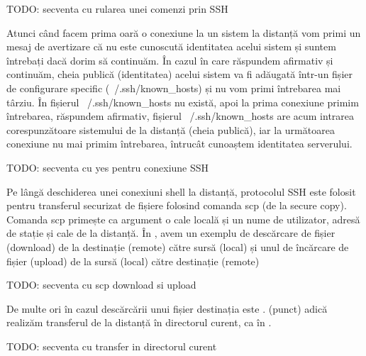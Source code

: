 \begin{screen}[caption={Rulare comenzi la distanță prin SSH},label={lst:sec:ssh-commands}]
TODO: secventa cu rularea unei comenzi prin SSH
\end{screen}

Atunci când facem prima oară o conexiune la un sistem la distanță vom primi un mesaj de avertizare că nu este cunoscută identitatea acelui sistem și suntem întrebați dacă dorim să continuăm. În cazul în care răspundem afirmativ și continuăm, cheia publică (identitatea) acelui sistem va fi adăugată într-un fișier de configurare specific (~/.ssh/known_hosts) și nu vom primi întrebarea mai târziu. În  fișierul ~/.ssh/known_hosts nu există, apoi la prima conexiune primim întrebarea, răspundem afirmativ, fișierul ~/.ssh/known_hosts are acum intrarea corespunzătoare sistemului de la distanță (cheia publică), iar la următoarea conexiune nu mai primim întrebarea, întrucât cunoaștem identitatea serverului.

\begin{screen}[caption={Verificarea identității serverului prin SSH},label={lst:sec:ssh-host-check}]
TODO: secventa cu yes pentru conexiune SSH
\end{screen}

Pe lângă deschiderea unei conexiuni shell la distanță, protocolul SSH este folosit pentru transferul securizat de fișiere folosind comanda scp (de la secure copy). Comanda scp primește ca argument o cale locală și un nume de utilizator, adresă de stație și cale de la distanță. În , avem un exemplu de descărcare de fișier (download) de la destinație (remote) către sursă (local) și unul de încărcare de fișier (upload) de la sursă (local) către destinație (remote)

\begin{screen}[caption={Transfer de fișiere prin SSH (scp)},label={lst:sec:scp}]
TODO: secventa cu scp download si upload
\end{screen}

De multe ori în cazul descărcării unui fișier destinația este . (punct) adică realizăm transferul de la distanță în directorul curent, ca în .

\begin{screen}[caption={Descărcarea unui fișier în directorul curent},label={lst:sec:scp-current}]
TODO: secventa cu transfer in directorul curent
\end{screen}

